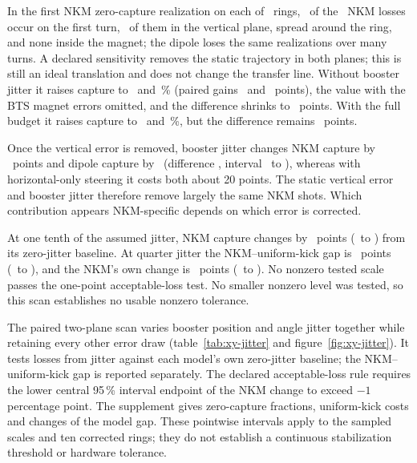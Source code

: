 \documentclass[aps,prab,reprint,amsmath,amssymb,floatfix,longbibliography]{revtex4-2}
\begin{document}
In the first NKM zero-capture realization on each of \LossCases\ rings, \LossFirstTurn\ of the \LossTotal\ NKM losses occur on the first turn, \LossVertical\ of them in the vertical plane, spread around the ring, and none inside the magnet; the dipole loses the same realizations over many turns. A declared sensitivity removes the static trajectory in both planes; this is still an ideal translation and does not change the transfer line. Without booster jitter it raises capture to \VsZeroNkm\ and \VsZeroDip\,\% (paired gains \VsGainZeroNkm\ and \VsGainZeroDip\ points), the value with the BTS magnet errors omitted, and the difference shrinks to \VsZeroGap\ points. With the full budget it raises capture to \VsFullNkm\ and \VsFullDip\,\%, but the difference remains \VsFullGap\ points.

Once the vertical error is removed, booster jitter changes NKM capture by \VsJitXYNkm\ points and dipole capture by \VsJitXYDip\ (difference \VsJitXYGap, interval \VsJitXYGapLo\ to \VsJitXYGapHi), whereas with horizontal-only steering it costs both about 20 points. The static vertical error and booster jitter therefore remove largely the same NKM shots. Which contribution appears NKM-specific depends on which error is corrected.

At one tenth of the assumed jitter, NKM capture changes by \RFiveTenthCost\ points (\RFiveTenthCostLo\ to \RFiveTenthCostHi) from its zero-jitter baseline. At quarter jitter the NKM--uniform-kick gap is \RFiveQuarterGap\ points (\RFiveQuarterGapLo\ to \RFiveQuarterGapHi), and the NKM's own change is \RFiveQuarterCost\ points (\RFiveQuarterCostLo\ to \RFiveQuarterCostHi). No nonzero tested scale passes the one-point acceptable-loss test. No smaller nonzero level was tested, so this scan establishes no usable nonzero tolerance.

The paired two-plane scan varies booster position and angle jitter together while retaining every other error draw (table~\ref{tab:xy-jitter} and figure~\ref{fig:xy-jitter}). It tests losses from jitter against each model's own zero-jitter baseline; the NKM--uniform-kick gap is reported separately. The declared acceptable-loss rule requires the lower central 95\,\% interval endpoint of the NKM change to exceed $-1$ percentage point. The supplement gives zero-capture fractions, uniform-kick costs and changes of the model gap. These pointwise intervals apply to the sampled scales and ten corrected rings; they do not establish a continuous stabilization threshold or hardware tolerance.
\end{document}

